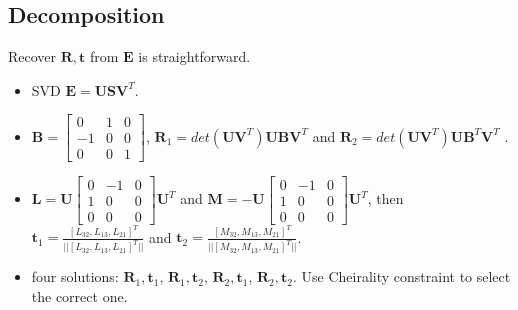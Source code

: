 \documentclass[a4paper]{report}
\begin{document}


\subsection{Decomposition}
Recover $\mathbf{R,t}$ from $\mathbf{E}$ is straightforward. 
\begin{itemize}
	\item SVD $\mathbf{E}=\mathbf{USV}^T$.
	\item  $\mathbf{B}=\left[
	\begin{matrix}
	0 & 1 & 0 \\ -1 & 0 & 0 \\ 0 & 0 & 1
	\end{matrix}
	\right]$, $\mathbf{R}_1=det(\mathbf{UV}^T)\mathbf{UBV}^T$ and $\mathbf{R}_2=det(\mathbf{UV}^T)\mathbf{UB}^T\mathbf{V}^T$ .
	\item $\mathbf{L}=\mathbf{U}\left[
	\begin{matrix}
	0 & -1 & 0 \\ 1 & 0 & 0 \\ 0 & 0 & 0
	\end{matrix}
	\right]\mathbf{U}^T$ and $\mathbf{M}=-\mathbf{U}\left[
	\begin{matrix}
	0 & -1 & 0 \\ 1 & 0 & 0 \\ 0 & 0 & 0
	\end{matrix}
	\right]\mathbf{U}^T$, then $\mathbf{t}_1=\frac{[L_{32}, L_{13}, L_{21}]^T}{||[L_{32}, L_{13}, L_{21}]^T||}$ and $\mathbf{t}_2=\frac{[M_{32}, M_{13}, M_{21}]^T}{||[M_{32}, M_{13}, M_{21}]^T||}$. 
	\item four solutions: $\mathbf{R}_1, \mathbf{t}_1$, $\mathbf{R}_1, \mathbf{t}_2$, $\mathbf{R}_2, \mathbf{t}_1$, $\mathbf{R}_2, \mathbf{t}_2$. Use Cheirality constraint to select the correct one.
\end{itemize}

 

\end{document}
